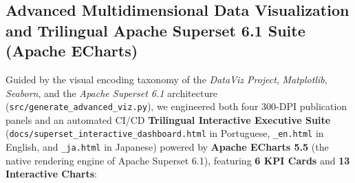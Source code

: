 \documentclass[12pt,a4paper]{article}
\begin{document}
\subsection{Advanced Multidimensional Data Visualization and Trilingual Apache Superset 6.1 Suite (Apache ECharts)}
Guided by the visual encoding taxonomy of the \textit{DataViz Project}, \textit{Matplotlib}, \textit{Seaborn}, and the \textit{Apache Superset 6.1} architecture (\texttt{src/generate\_advanced\_viz.py}), we engineered both four 300-DPI publication panels and an automated CI/CD \textbf{Trilingual Interactive Executive Suite} (\texttt{docs/superset\_interactive\_dashboard.html} in Portuguese, \texttt{\_en.html} in English, and \texttt{\_ja.html} in Japanese) powered by \textbf{Apache ECharts 5.5} (the native rendering engine of Apache Superset 6.1), featuring \textbf{6 KPI Cards} and \textbf{13 Interactive Charts}:
\end{document}
